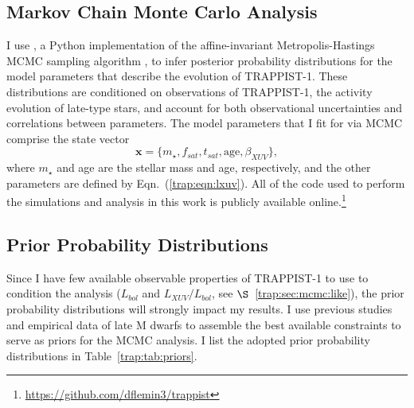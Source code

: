 
\subsection{Markov Chain Monte Carlo Analysis} \label{trap:sec:mcmc}

I use \emcee, a Python implementation of the affine-invariant Metropolis-Hastings MCMC sampling algorithm \citep{ForemanMackey2013}, to infer posterior probability distributions for the model parameters that describe the evolution of TRAPPIST-1. These distributions are conditioned on observations of TRAPPIST-1, the activity evolution of late-type stars, and account for both observational uncertainties and correlations between parameters. The model parameters that I fit for via MCMC comprise the state vector
\begin{equation} \label{trap:eqn:state}
    \textbf{x} = \{m_{\star}, f_{sat}, t_{sat}, \mathrm{age}, \beta_{XUV}\},
\end{equation}
where $m_{\star}$ and age are the stellar mass and age, respectively, and the other parameters are defined by Eqn.~(\ref{trap:eqn:lxuv}). All of the code used to perform the simulations and analysis in this work is publicly available online.\footnote{ \href{https://github.com/dflemin3/trappist}{https://github.com/dflemin3/trappist}}

\subsection{Prior Probability Distributions} \label{trap:sec:mcmc:priors}

Since I have few available observable properties of TRAPPIST-1 to use to condition the analysis ($L_{bol}$ and $L_{XUV}/L_{bol}$, see $\S$~\ref{trap:sec:mcmc:like}), the prior probability distributions will strongly impact my results. I use previous studies and empirical data of late M dwarfs to assemble the best available constraints to serve as priors for the MCMC analysis. I list the adopted prior probability distributions in Table~\ref{trap:tab:priors}.

